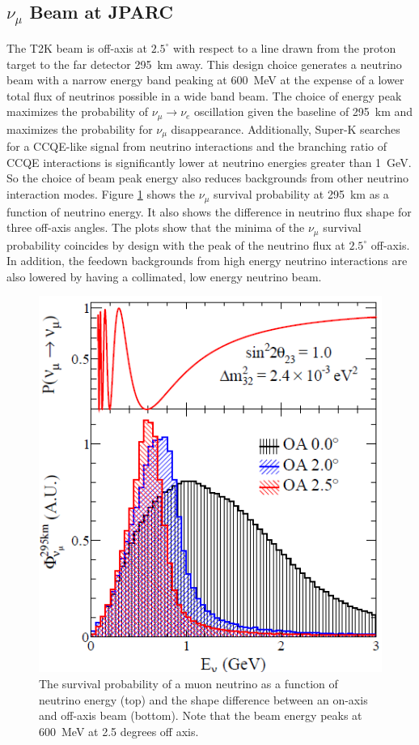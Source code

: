 \subsection{$\nu_\mu$ Beam at JPARC}

The T2K beam is off-axis at $2.5^{\circ}$ with respect to a line drawn from the proton target to the far detector 295~km away. This design choice generates a neutrino beam with a narrow energy band peaking at 600~MeV at the expense of a lower total flux of neutrinos possible in a wide band beam. The choice of energy peak maximizes the probability of $\nu_\mu \rightarrow \nu_e$ oscillation given the baseline of 295~km and maximizes the probability for $\nu_{\mu}$ disappearance. Additionally, Super-K searches for a CCQE-like signal from neutrino interactions and the branching ratio of CCQE interactions is significantly lower at neutrino energies greater than 1~GeV. So the choice of beam peak energy also reduces backgrounds from other neutrino interaction modes. Figure \ref{fig:oabeamflux} shows the $\nu_\mu$ survival probability at 295~km as a function of neutrino energy. It also shows the difference in neutrino flux shape for three off-axis angles. The plots show that the minima of the $\nu_\mu$ survival probability coincides by design with the peak of the neutrino flux at $2.5^{\circ}$ off-axis. In addition, the feedown backgrounds from high energy neutrino interactions are also lowered by having a collimated, low energy neutrino beam.

\begin{figure}
\begin{center}
\includegraphics[width=.7\textwidth]{./Figures/OAbeamflux.png}
\end{center}
\caption{The survival probability of a muon neutrino as a function of
  neutrino energy (top) and the shape difference between an on-axis
  and off-axis beam (bottom). Note that the beam energy peaks at 600~MeV at 2.5 degrees off axis. \label{fig:oabeamflux}}
\end{figure}

